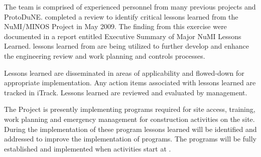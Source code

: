 The  team is comprised of experienced personnel from many previous
projects and ProtoDuNE.  \fnal completed a
review to identify critical lessons learned from the NuMI/MINOS
Project in May 2009. The finding from this exercise were documented in
a report entitled Executive Summary of Major NuMI Lessons Learned.
 lessons learned from  are being utilized
to further develop and enhance the  engineering review and
work planning and controls processes.

Lessons learned are disseminated in areas of applicability and
flowed-down for appropriate implementation. Any action items
associated with lessons learned are tracked in iTrack. Lessons learned
are reviewed and evaluated by \fnal management.

The  Project is presently implementing 
programs required for site access, training, work planning and
emergency management for construction activities on the \surf
site. During the implementation of these program lessons learned will
be identified and addressed to improve the implementation of
 programs.  The  programs will be fully
established and implemented when  activities start at
\surf.
